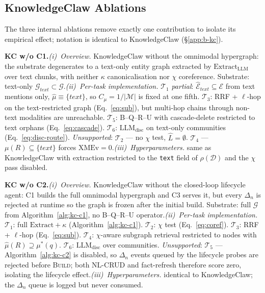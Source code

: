 \documentclass{article}
\begin{document}
\subsection{KnowledgeClaw Ablations}\label{app:b-abl}

The three internal ablations remove exactly one contribution to isolate its empirical effect; notation is identical to KnowledgeClaw (\S\ref{app:b-kc}).

\noindent\textbf{KC w/o C1.}\quad\emph{(i)~Overview.} KnowledgeClaw without the omnimodal hypergraph: the substrate degenerates to a text-only entity graph extracted by $\mathrm{Extract}_{\mathrm{LLM}}$ over text chunks, with neither $\kappa$ canonicalisation nor $\chi$ coreference. Substrate: text-only $\mathcal{G}_{\textit{text}}\!\subset\!\mathcal{G}$.\quad\emph{(ii)~Per-task implementation.} $\mathcal{T}_1$ \emph{partial}: $\hat{\mathcal{E}}_{\textit{text}}\!\subseteq\!\mathcal{E}$ from text mentions only, $\hat{\mu}\!\equiv\!\{\textit{text}\}$, so $C_\mu\!=\!1/|\mathcal{M}|$ is fixed at one fifth. $\mathcal{T}_3$: RRF + $\ell$-hop on the text-restricted graph (Eq.~\eqref{eq:sub}), but multi-hop chains through non-text modalities are unreachable. $\mathcal{T}_5$: B--Q--R--U with cascade-delete restricted to text orphans (Eq.~\eqref{eq:cascade}). $\mathcal{T}_6$: $\mathrm{LLM}_{\mathrm{disc}}$ on text-only communities (Eq.~\eqref{eq:disc-route}). \emph{Unsupported}: $\mathcal{T}_2$ — no $\chi$ test, $\hat{L}\!=\!\emptyset$. $\mathcal{T}_4$ — $\mu(R)\!\subseteq\!\{\textit{text}\}$ forces $\mathrm{XMEv}\!=\!0$.\quad\emph{(iii)~Hyperparameters.} same as KnowledgeClaw with extraction restricted to the \texttt{text} field of $\rho(\mathcal{D})$ and the $\chi$ pass disabled.

\noindent\textbf{KC w/o C2.}\quad\emph{(i)~Overview.} KnowledgeClaw without the closed-loop lifecycle agent: C1 builds the full omnimodal hypergraph and C3 serves it, but every $\Delta_n$ is rejected at runtime so the graph is frozen after the initial build. Substrate: full $\mathcal{G}$ from Algorithm~\ref{alg:kc-c1}, no B--Q--R--U operator.\quad\emph{(ii)~Per-task implementation.} $\mathcal{T}_1$: full $\mathrm{Extract}\!+\!\kappa$ (Algorithm~\ref{alg:kc-c1}). $\mathcal{T}_2$: $\chi$ test (Eq.~\eqref{eq:coref}). $\mathcal{T}_3$: RRF + $\ell$-hop (Eq.~\eqref{eq:sub}). $\mathcal{T}_4$: $\chi$-aware subgraph retrieval restricted to nodes with $\hat{\mu}(R)\!\supseteq\!\mu^{*}(q)$. $\mathcal{T}_6$: $\mathrm{LLM}_{\mathrm{disc}}$ over communities. \emph{Unsupported}: $\mathcal{T}_5$ — Algorithm~\ref{alg:kc-c2} is disabled, so $\Delta_n$ events queued by the lifecycle probes are rejected before \textsc{Build}; both NL-CRUD and fact-refresh therefore score zero, isolating the lifecycle effect.\quad\emph{(iii)~Hyperparameters.} identical to KnowledgeClaw; the $\Delta_n$ queue is logged but never consumed.
\end{document}

